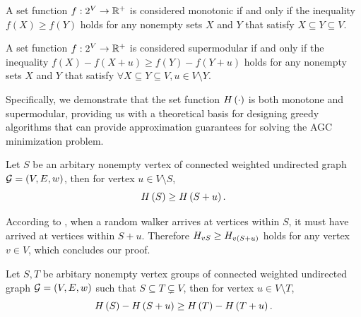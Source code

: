 \documentclass[10pt,twocolumn,twoside]{IEEEtran}
\begin{document}
\begin{definition}[Monotonicity]
    A set function \(f:2^{V}\to\mathbb{R}^+\) is considered monotonic if and only if the inequality \(f(X)\ge f(Y)\) holds for any nonempty sets \(X\) and \(Y\) that satisfy \(X\subseteq Y\subseteq V\).
\end{definition}

\begin{definition}[Supermodularity]
    A set function \(f:2^{V}\to\mathbb{R}^+\) is considered supermodular if and only if the inequality \(f(X)-f(X+u)\ge f(Y)-f(Y+u)\) holds for any nonempty sets \(X\) and \(Y\) that satisfy \(\forall X\subseteq Y\subseteq V, u\in V\setminus Y\).
\end{definition}

Specifically, we demonstrate that the set function \(H\left(\cdot\right)\) is both monotone and supermodular, providing us with a theoretical basis for designing greedy algorithms that can provide approximation guarantees for solving the AGC minimization problem.

\begin{theorem}\label{thm:mono}
    Let \(S\) be an arbitary nonempty vertex of connected weighted undirected graph \(\mathcal{G}=(V,E,w)\), then for vertex \(u\in V\setminus S\),
    \begin{equation*}
        H\left(S\right)\ge H\left(S+u\right).
    \end{equation*}
\end{theorem}

\begin{IEEEproof}
    According to , when a random walker arrives at vertices within \(S\), it must have arrived at vertices within \(S+u\). Therefore \(H_{vS}\ge H_{v\left( S+u \right)}\) holds for any vertex \(v\in V\), which concludes our proof.
\end{IEEEproof}

\begin{theorem}\label{thm:supermod}
    Let \(S,T\) be arbitary nonempty vertex groups of connected weighted undirected graph \(\mathcal{G}=(V,E,w)\) such that \(S\subseteq T\subsetneq V\), then for vertex \(u\in V\setminus T\),
    \begin{equation*}
        H\left(S\right)-H\left(S+u\right)\ge H\left(T\right)-H\left(T+u\right).
    \end{equation*}
\end{theorem}
\end{document}
